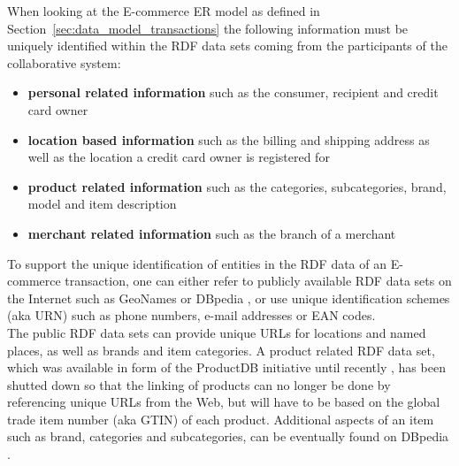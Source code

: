 When looking at the \gls{E-commerce} \gls{ER} model as defined in Section~\ref{sec:data_model_transactions} the following information must be uniquely identified within the \gls{RDF} data sets coming from the participants of the collaborative system: \@

\begin{itemize}
	\item \textbf{personal related information} such as the consumer, recipient and credit card owner
	\item \textbf{location based information} such as the billing and shipping address as well as the location a credit card owner is registered for
	\item \textbf{product related information} such as the categories, subcategories, brand, model and item description
	\item \textbf{merchant related information} such as the branch of a merchant
\end{itemize}

To support the unique identification of entities in the \gls{RDF} data of an \gls{E-commerce} transaction, one can either refer to publicly available \gls{RDF} data sets on the Internet such as GeoNames \citep{geonames} or DBpedia \citep{dbPedia.org}, or use unique identification schemes (aka \gls{URN}) such as phone numbers, e-mail addresses or \gls{EAN} codes. \\

The public \gls{RDF} data sets can provide unique \gls{URL}s for locations and named places, as well as brands and item categories. A product related \gls{RDF} data set, which was available in form of the ProductDB initiative until recently \citep{bouzidi2014product}, has been shutted down so that the linking of products can no longer be done by referencing unique \gls{URL}s from the Web, but will have to be based on the global trade item number (aka \gls{GTIN}) of each product. Additional aspects of an item such as brand, categories and subcategories, can be eventually found on DBpedia \citep{dbPedia.org}. \\

